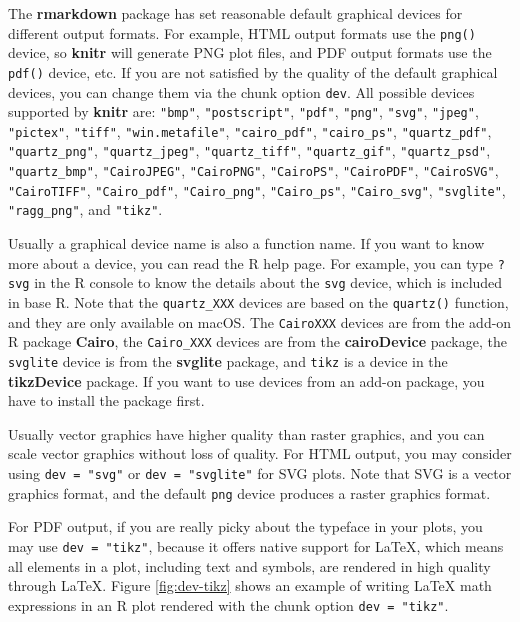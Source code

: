 \documentclass[
  11pt,
]{krantz}
\begin{document}
The \textbf{rmarkdown} package has set reasonable default graphical devices for different output formats. For example, HTML output formats use the \texttt{png()} device, so \textbf{knitr} will generate PNG plot files, and PDF output formats use the \texttt{pdf()} device, etc. If you are not satisfied by the quality of the default graphical devices, you can change them via the chunk option \texttt{dev}. All possible devices supported by \textbf{knitr} are: \texttt{"bmp"}, \texttt{"postscript"}, \texttt{"pdf"}, \texttt{"png"}, \texttt{"svg"}, \texttt{"jpeg"}, \texttt{"pictex"}, \texttt{"tiff"}, \texttt{"win.metafile"}, \texttt{"cairo\_pdf"}, \texttt{"cairo\_ps"}, \texttt{"quartz\_pdf"}, \texttt{"quartz\_png"}, \texttt{"quartz\_jpeg"}, \texttt{"quartz\_tiff"}, \texttt{"quartz\_gif"}, \texttt{"quartz\_psd"}, \texttt{"quartz\_bmp"}, \texttt{"CairoJPEG"}, \texttt{"CairoPNG"}, \texttt{"CairoPS"}, \texttt{"CairoPDF"}, \texttt{"CairoSVG"}, \texttt{"CairoTIFF"}, \texttt{"Cairo\_pdf"}, \texttt{"Cairo\_png"}, \texttt{"Cairo\_ps"}, \texttt{"Cairo\_svg"}, \texttt{"svglite"}, \texttt{"ragg\_png"}, and \texttt{"tikz"}.

Usually a graphical device name is also a function name. If you want to know more about a device, you can read the R help page. For example, you can type \texttt{?svg} in the R console to know the details about the \texttt{svg} device, which is included in base R. Note that the \texttt{quartz\_XXX} devices are based on the \texttt{quartz()} function, and they are only available on macOS. The \texttt{CairoXXX} devices are from the add-on R package \textbf{Cairo}, the \texttt{Cairo\_XXX} devices are from the \textbf{cairoDevice} package, the \texttt{svglite} device is from the \textbf{svglite} package, and \texttt{tikz} is a device in the \textbf{tikzDevice} package. If you want to use devices from an add-on package, you have to install the package first.

Usually vector graphics have higher quality than raster graphics, and you can scale vector graphics without loss of quality. For HTML output, you may consider using \texttt{dev\ =\ "svg"} or \texttt{dev\ =\ "svglite"} for SVG plots. Note that SVG is a vector graphics format, and the default \texttt{png} device produces a raster graphics format.

For PDF output, if you are really picky about the typeface in your plots, you may use \texttt{dev\ =\ "tikz"}, because it offers native support for LaTeX, which means all elements in a plot, including text and symbols, are rendered in high quality through LaTeX. Figure \ref{fig:dev-tikz} shows an example of writing LaTeX math expressions in an R plot rendered with the chunk option \texttt{dev\ =\ "tikz"}.
\end{document}
